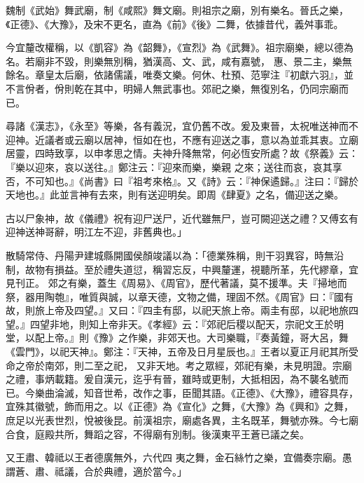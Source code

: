 \begin{pinyinscope}
 魏制《武始》舞武廟，制《咸熙》舞文廟。則祖宗之廟，別有樂名。晉氏之樂，《正德》、《大豫》，及宋不更名，直為《前》《後》二舞，依據昔代，義舛事乖。



 今宜釐改權稱，以《凱容》為《韶舞》，《宣烈》為《武舞》。祖宗廟樂，總以德為名。若廟非不毀，則樂無別稱，猶漢高、文、武，咸有嘉號，
 惠、景二主，樂無餘名。章皇太后廟，依諸儒議，唯奏文樂。何休、杜預、范寧注『初獻六羽』，並不言佾者，佾則乾在其中，明婦人無武事也。郊祀之樂，無復別名，仍同宗廟而已。



 尋諸《漢志》，《永至》等樂，各有義況，宜仍舊不改。爰及東晉，太祝唯送神而不迎神。近議者或云廟以居神，恒如在也，不應有迎送之事，意以為並乖其衷。立廟居靈，四時致享，以申孝思之情。夫神升降無常，何必恆安所處？故《祭義》云：『樂以迎來，哀以送往。』鄭注云：『迎來而樂，樂親
 之來；送往而哀，哀其享否，不可知也。』《尚書》曰『祖考來格』。又《詩》云：『神保遹歸。』注曰：『歸於天地也。』此並言神有去來，則有送迎明矣。即周《肆夏》之名，備迎送之樂。



 古以尸象神，故《儀禮》祝有迎尸送尸，近代雖無尸，豈可闕迎送之禮？又傅玄有迎神送神哥辭，明江左不迎，非舊典也。」



 散騎常侍、丹陽尹建城縣開國侯顏竣議以為：「德業殊稱，則干羽異容，時無沿制，故物有損益。至於禮失道愆，稱習忘反，中興釐運，視聽所革，先代繆章，宜見刊正。
 郊之有樂，蓋生《周易》、《周官》，歷代著議，莫不援準。夫『掃地而祭，器用陶匏』，唯質與誠，以章天德，文物之備，理固不然。《周官》曰：『國有故，則旅上帝及四望。』又曰：『四圭有邸，以祀天旅上帝。兩圭有邸，以祀地旅四望。』四望非地，則知上帝非天。《孝經》云：『郊祀后稷以配天，宗祀文王於明堂，以配上帝。』則《豫》之作樂，非郊天也。大司樂職，『奏黃鐘，哥大呂，舞《雲門》，以祀天神』。鄭注：『天神，五帝及日月星辰也。』王者以夏正月祀其所受命之帝於南郊，則二至之祀，
 又非天地。考之眾經，郊祀有樂，未見明證。宗廟之禮，事炳載籍。爰自漢元，迄乎有晉，雖時或更制，大抵相因，為不襲名號而已。今樂曲淪滅，知音世希，改作之事，臣聞其語。《正德》、《大豫》，禮容具存，宜殊其徽號，飾而用之。以《正德》為《宣化》之舞，《大豫》為《興和》之舞，庶足以光表世烈，悅被後昆。前漢祖宗，廟處各異，主名既革，舞號亦殊。今七廟合食，庭殿共所，舞蹈之容，不得廟有別制。後漢東平王蒼已議之矣。



 又王肅、韓祗以王者德廣無外，六代四
 夷之舞，金石絲竹之樂，宜備奏宗廟。愚謂蒼、肅、祗議，合於典禮，適於當今。」




\end{pinyinscope}
